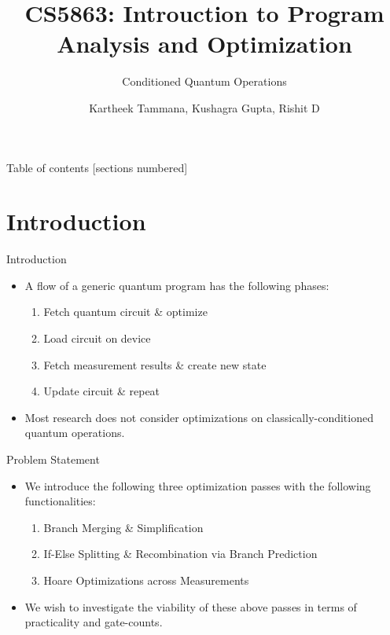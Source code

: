 \documentclass[10pt]{beamer}
\title{CS5863: Introuction to Program Analysis and Optimization}
\subtitle{Conditioned Quantum Operations}
\date{}
\author{Kartheek Tammana, Kushagra Gupta, Rishit D}
\institute{Indian Institute of Technology, Hyderabad}
\begin{document}
\maketitle

\begin{frame}{Table of contents}
  [sections numbered]
  \tableofcontents[hideallsubsections]
\end{frame}


\section{Introduction}

\begin{frame}{Introduction}
    \begin{itemize}
        \item A flow of a generic quantum program has the following phases:
        \begin{enumerate}
            \item Fetch quantum circuit \& optimize
            \item Load circuit on device
            \item Fetch measurement results \& create new state
            \item Update circuit \& repeat
        \end{enumerate}

        \item Most research does not consider optimizations on classically-conditioned quantum operations.
    \end{itemize}
\end{frame}

\begin{frame}{Problem Statement}
    \begin{itemize}
        \item We introduce the following three optimization passes with the following functionalities:
        \begin{enumerate}
            \item Branch Merging \& Simplification
            \item If-Else Splitting \& Recombination via Branch Prediction
            \item Hoare Optimizations across Measurements
        \end{enumerate}

        \item We wish to investigate the viability of these above passes in terms of practicality and gate-counts.
    \end{itemize}
\end{frame}
\end{document}
